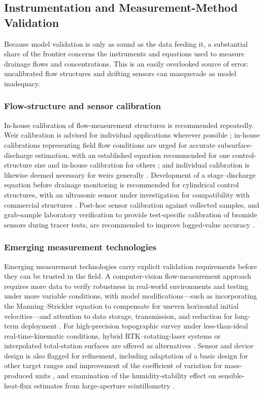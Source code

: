 \subsection{Instrumentation and Measurement-Method Validation}

Because model validation is only as sound as the data feeding it, a substantial share of the frontier concerns the instruments and equations used to measure drainage flows and concentrations. This is an easily overlooked source of error: uncalibrated flow structures and drifting sensors can masquerade as model inadequacy.

\subsubsection{Flow-structure and sensor calibration}

In-house calibration of flow-measurement structures is recommended repeatedly. Weir calibration is advised for individual applications wherever possible \parencite{Christianson2019}; in-house calibrations representing field flow conditions are urged for accurate subsurface-discharge estimation, with an established equation recommended for one control-structure size and in-house calibration for others \parencite{Katuwal2024}; and individual calibration is likewise deemed necessary for weirs generally \parencite{Napierala2023}. Development of a stage--discharge equation before drainage monitoring is recommended for cylindrical control structures, with an ultrasonic sensor under investigation for compatibility with commercial structures \parencite{BinShokrana2021}. Post-hoc sensor calibration against collected samples, and grab-sample laboratory verification to provide test-specific calibration of bromide sensors during tracer tests, are recommended to improve logged-value accuracy \parencite{deOliveira2023b}.

\subsubsection{Emerging measurement technologies}

Emerging measurement technologies carry explicit validation requirements before they can be trusted in the field. A computer-vision flow-measurement approach requires more data to verify robustness in real-world environments and testing under more variable conditions, with model modifications---such as incorporating the Manning--Strickler equation to compensate for uneven horizontal initial velocities---and attention to data storage, transmission, and reduction for long-term deployment \parencite{Young2023}. For high-precision topographic survey under less-than-ideal real-time-kinematic conditions, hybrid RTK--rotating-laser systems or interpolated total-station surfaces are offered as alternatives \parencite{Freeland2014}. Sensor and device design is also flagged for refinement, including adaptation of a basic design for other target ranges and improvement of the coefficient of variation for mass-produced units \parencite{Enamorado2007}, and examination of the humidity-stability effect on sensible-heat-flux estimates from large-aperture scintillometry \parencite{Zhang2010}.

